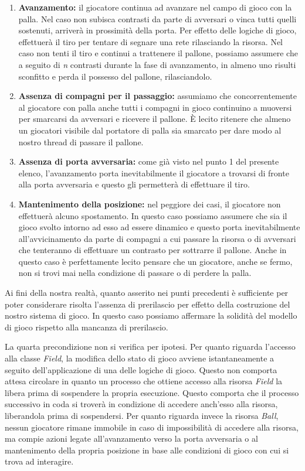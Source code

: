 \documentclass[aps,letterpaper,10pt]{article}
\begin{document}
\begin{enumerate}
\item \textbf{Avanzamento:} il giocatore continua ad avanzare nel campo di gioco con la palla. Nel caso non subisca
contrasti da parte di avversari o vinca tutti quelli sostenuti, arriver\`a in prossimit\`a della porta. Per effetto
delle logiche di gioco, effettuer\`a il tiro per tentare di segnare una rete rilasciando la risorsa. Nel caso non tenti
il tiro e continui a trattenere il pallone, possiamo assumere che a seguito di \emph{n} contrasti durante la fase di
avanzamento, in almeno uno risulti sconfitto e perda il possesso del pallone, rilasciandolo.
\item\textbf{Assenza di compagni per il passaggio:} assumiamo che concorrentemente al giocatore con palla anche tutti i
compagni in gioco continuino a muoversi per smarcarsi da avversari e ricevere il pallone. \`E lecito ritenere che almeno
un giocatori visibile dal portatore di palla sia smarcato per dare modo al nostro thread di passare il pallone.
\item \textbf{Assenza di porta avversaria:} come gi\`a visto nel punto 1 del presente elenco, l'avanzamento porta
inevitabilmente il giocatore a trovarsi di fronte alla porta avversaria e questo gli permetter\`a di effettuare il tiro.
\item \textbf{Mantenimento della posizione:} nel peggiore dei casi, il giocatore non effettuer\`a alcuno spostamento. In
questo caso possiamo assumere che sia il gioco svolto intorno ad esso ad essere dinamico e questo porta inevitabilmente
all'avvicinamento da parte di compagni a cui passare la risorsa o di avversari che tenteranno di effettuare un contrasto
per sottrarre il pallone. Anche in questo caso \`e perfettamente lecito pensare che un giocatore, anche se fermo, non si
trovi mai nella condizione di passare o di perdere la palla.
\end{enumerate}

Ai fini della nostra realt\`a, quanto asserito nei punti precedenti \`e sufficiente per poter considerare risolta
l'assenza di prerilascio per effetto della costruzione del nostro sistema di gioco. In questo caso possiamo affermare la
solidit\`a del modello di gioco rispetto alla mancanza di prerilascio. \vspace{3mm}

La quarta precondizione non si verifica per ipotesi. Per quanto riguarda l'accesso alla classe \emph{Field}, la modifica
dello stato di gioco avviene istantaneamente a seguito dell'applicazione di una delle logiche di gioco. Questo non
comporta attesa circolare in quanto un processo che ottiene accesso alla risorsa \emph{Field} la libera prima di
sospendere la propria esecuzione. Questo comporta che il processo successivo in coda si trover\`a in condizione di
accedere anch'esso alla risorsa, liberandola prima di sospendersi. Per quanto riguarda invece la risorsa \emph{Ball},
nessun giocatore rimane immobile in caso di impossibilit\`a di accedere alla risorsa, ma compie azioni legate
all'avanzamento verso la porta avversaria o al mantenimento della propria posizione in base alle condizioni di gioco con
cui si trova ad interagire. \vspace{3mm}
\end{document}
